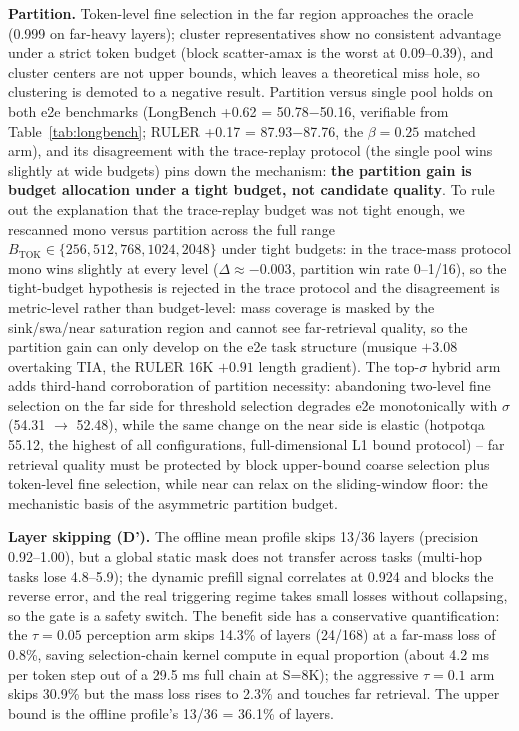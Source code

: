 \documentclass[11pt]{article}
\begin{document}
\textbf{Partition.} Token-level fine selection in the far region approaches the oracle (0.999 on far-heavy layers); cluster representatives show no consistent advantage under a strict token budget (block scatter-amax is the worst at 0.09--0.39), and cluster centers are not upper bounds, which leaves a theoretical miss hole, so clustering is demoted to a negative result. Partition versus single pool holds on both e2e benchmarks (LongBench +0.62 = 50.78$-$50.16, verifiable from Table~\ref{tab:longbench}; RULER +0.17 = 87.93$-$87.76, the $\beta{=}0.25$ matched arm), and its disagreement with the trace-replay protocol (the single pool wins slightly at wide budgets) pins down the mechanism: \textbf{the partition gain is budget allocation under a tight budget, not candidate quality}. To rule out the explanation that the trace-replay budget was not tight enough, we rescanned mono versus partition across the full range $B_{\mathrm{TOK}}\in\{256,512,768,1024,2048\}$ under tight budgets: in the trace-mass protocol mono wins slightly at every level ($\Delta\approx-0.003$, partition win rate 0--1/16), so the tight-budget hypothesis is rejected in the trace protocol and the disagreement is metric-level rather than budget-level: mass coverage is masked by the sink/swa/near saturation region and cannot see far-retrieval quality, so the partition gain can only develop on the e2e task structure (musique $+3.08$ overtaking TIA, the RULER 16K $+0.91$ length gradient). The top-$\sigma$ hybrid arm adds third-hand corroboration of partition necessity: abandoning two-level fine selection on the far side for threshold selection degrades e2e monotonically with $\sigma$ (54.31 $\rightarrow$ 52.48), while the same change on the near side is elastic (hotpotqa 55.12, the highest of all configurations, full-dimensional L1 bound protocol) -- far retrieval quality must be protected by block upper-bound coarse selection plus token-level fine selection, while near can relax on the sliding-window floor: the mechanistic basis of the asymmetric partition budget.

\textbf{Layer skipping (D').} The offline mean profile skips 13/36 layers (precision 0.92--1.00), but a global static mask does not transfer across tasks (multi-hop tasks lose 4.8--5.9); the dynamic prefill signal correlates at 0.924 and blocks the reverse error, and the real triggering regime takes small losses without collapsing, so the gate is a safety switch. The benefit side has a conservative quantification: the $\tau{=}0.05$ perception arm skips 14.3\% of layers (24/168) at a far-mass loss of 0.8\%, saving selection-chain kernel compute in equal proportion (about 4.2 ms per token step out of a 29.5 ms full chain at S=8K); the aggressive $\tau{=}0.1$ arm skips 30.9\% but the mass loss rises to 2.3\% and touches far retrieval. The upper bound is the offline profile's 13/36 = 36.1\% of layers.
\end{document}
